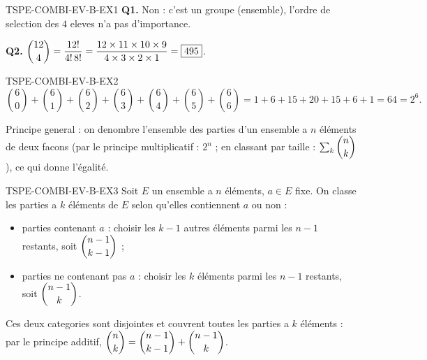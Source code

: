%
\begin{corrige}{TSPE-COMBI-EV-B-EX1}
\textbf{Q1.} Non : c'est un groupe (ensemble), l'ordre de selection des $4$ eleves n'a pas d'importance.

\textbf{Q2.} $\dbinom{12}{4} = \dfrac{12!}{4!\,8!} = \dfrac{12\times11\times10\times9}{4\times3\times2\times1} = \boxed{495}$.
\end{corrige}

\begin{corrige}{TSPE-COMBI-EV-B-EX2}
\[
  \binom{6}{0}+\binom{6}{1}+\binom{6}{2}+\binom{6}{3}+\binom{6}{4}+\binom{6}{5}+\binom{6}{6} = 1+6+15+20+15+6+1 = 64 = 2^6.
\]

Principe general : on denombre l'ensemble des parties d'un ensemble a $n$ éléments de deux facons (par le principe multiplicatif : $2^n$ ; en classant par taille : $\sum_k \dbinom{n}{k}$), ce qui donne l'égalité.
\end{corrige}

\begin{corrige}{TSPE-COMBI-EV-B-EX3}
Soit $E$ un ensemble a $n$ éléments, $a \in E$ fixe. On classe les parties a $k$ éléments de $E$ selon qu'elles contiennent $a$ ou non :
\begin{itemize}
  \item parties contenant $a$ : choisir les $k-1$ autres éléments parmi les $n-1$ restants, soit $\dbinom{n-1}{k-1}$ ;
  \item parties ne contenant pas $a$ : choisir les $k$ éléments parmi les $n-1$ restants, soit $\dbinom{n-1}{k}$.
\end{itemize}
Ces deux categories sont disjointes et couvrent toutes les parties a $k$ éléments : par le principe additif, $\dbinom{n}{k} = \dbinom{n-1}{k-1}+\dbinom{n-1}{k}$.
\end{corrige}

